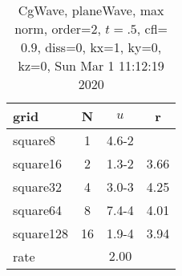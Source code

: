 \begin{table}[H]\tableFont %
\begin{center}
\begin{tabular}{|l|c|c|c|} \hline 
grid  & N &  $ u $ & r \\ \hline 
   square8 &     1 & \num{4.6}{-2} &       \\ \hline
  square16 &     2 & \num{1.3}{-2} &  3.66  \\ \hline
  square32 &     4 & \num{3.0}{-3} &  4.25  \\ \hline
  square64 &     8 & \num{7.4}{-4} &  4.01  \\ \hline
 square128 &    16 & \num{1.9}{-4} &  3.94  \\ \hline
    rate             &       &  $2.00$       &       \\ \hline
\end{tabular}
\caption{CgWave, planeWave, max norm, order=$2$, $t=.5$, cfl=$0.9$, diss=$0$, kx=1, ky=0, kz=0, Sun Mar  1 11:12:19 2020}\label{table:planeWaveOrder2max}
\end{center}
\end{table}
